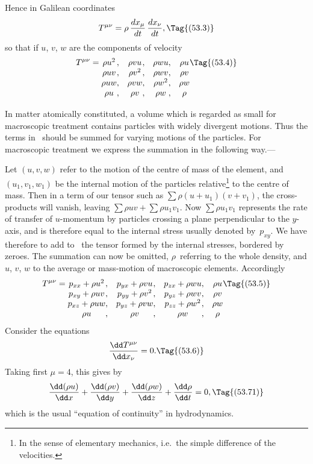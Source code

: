 \documentclass[12pt]{book}
\begin{document}
Hence in Galilean coordinates
\[
T^{\mu\nu} = \rho\, \frac{dx_{\mu}}{dt}\, \frac{dx_{\nu}}{dt},
\Tag{(53.3)}
\]
so that if $u$, $v$, $w$ are the components of velocity
\[
T^{\mu\nu} =
\begin{array}[t]{@{}c@{,\quad}c@{,\quad}c@{,\quad}c@{}}
  \rho u^{2} & \rho v u & \rho w u & \rho u\\
  \rho u v & \rho v^{2} & \rho w v & \rho v\\
  \rho u w & \rho v w & \rho w^{2} & \rho w\\
  \rho u & \rho v & \rho w & \rho\\
\end{array}
\Tag{(53.4)}
\]

In matter atomically constituted, a volume which is regarded as small for
macroscopic treatment contains particles with widely divergent motions. Thus
the terms in~ should be summed for varying motions of the particles.
For macroscopic treatment we express the summation in the following way.---

{\Loosen Let $(u, v, w)$ refer to the motion of the centre of mass of the element, and
%
$(u_{1}, v_{1}, w_{1})$ be the internal motion of the particles relative\footnote
  {In the sense of elementary mechanics, i.e.\ the simple difference of the velocities.}
to the centre of
mass. Then in a term of our tensor such as $\sum \rho(u + u_{1})(v + v_{1})$, the cross-products
will vanish, leaving $\sum \rho u v + \sum \rho u_{1}v_{1}$. Now $\sum \rho u_{1}v_{1}$ represents the rate of
transfer of $u$-momentum by particles crossing a plane perpendicular to the
$y$-axis, and is therefore equal to the internal stress usually denoted by~$p_{xy}$.
We have therefore to add to~ the tensor formed by the internal stresses,
bordered by zeroes. The summation can now be omitted, $\rho$~referring to the
whole density, and $u$, $v$, $w$ to the average or mass-motion of macroscopic
elements. Accordingly}
\[
T^{\mu\nu} =
\begin{array}[t]{@{}c@{,\quad}c@{,\quad}c@{,\quad}c@{}}
  p_{xx} + \rho u^{2} & p_{yx} + \rho v u & p_{zx} + \rho w u & \rho u\\
  p_{xy} + \rho u v & p_{yy} + \rho v^{2} & p_{yz} + \rho w v & \rho v\\
  p_{xz} + \rho u w & p_{yz} + \rho v w & p_{zz} + \rho w^{2} & \rho w\\
  \rho u & \rho v & \rho w & \rho\\
\end{array}
\Tag{(53.5)}
\]
Consider the equations
\[
\frac{\dd T^{\mu\nu}}{\dd x_{\nu}} = 0.
\Tag{(53.6)}
\]
Taking first $\mu = 4$, this gives by~
\[
\frac{\dd(\rho u)}{\dd x} + \frac{\dd(\rho v)}{\dd y} + \frac{\dd(\rho w)}{\dd z} + \frac{\dd\rho}{\dd t} = 0,
\Tag{(53.71)}
\]
which is the usual ``equation of continuity'' in hydrodynamics.
%
%
\end{document}
